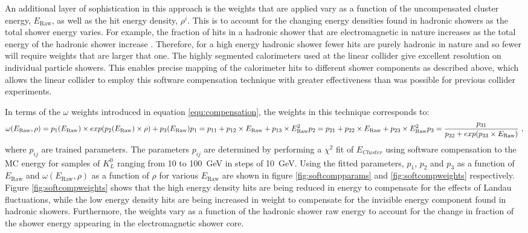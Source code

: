 An additional layer of sophistication in this approach is the weights that are applied vary as a function of the uncompensated cluster energy, $E_{\text{Raw}}$, as well as the hit energy density, $\rho^{i}$.  This is to account for the changing energy densities found in hadronic showers as the total shower energy varies.  For example, the fraction of hits in a hadronic shower that are electromagnetic in nature increases as the total energy of the hadronic shower increase \cite{Wigmans:2000vf}.  Therefore, for a high energy hadronic shower fewer hits are purely hadronic in nature and so fewer will require weights that are larger that one.  The highly segmented calorimeters used at the linear collider give excellent resolution on individual particle showers.  This enables precise mapping of the calorimeter hits to different shower components as described above, which allows the linear collider to employ this software compensation technique with greater effectiveness than was possible for previous collider experiments.  

In terms of the $\omega$ weights introduced in equation \ref{equ:compensation}, the weights \cite{Adloff:2012gv} in this technique corresponds to: 
%
\begin{equation}
\omega(E_{\text{Raw}}, \rho) = p_{1}(E_{\text{Raw}}) \times exp(p_{2}(E_{\text{Raw}}) \times \rho) + p_{3}(E_{\text{Raw}}) \\
p_{1} = p_{11} + p_{12} \times E_{\text{Raw}} + p_{13} \times E_{\text{Raw}}^{2} \\
p_{2} = p_{21} + p_{22} \times E_{\text{Raw}} + p_{23} \times E_{\text{Raw}}^{2} \\
p_{3} = \frac{p_{31}}{p_{32} + exp(p_{33} \times E_{\text{Raw}})}\text{ ,}
\label{equ:softcompweight}
\end{equation}
%
\noindent where $p_{ij}$ are trained parameters.  The parameters $p_{ij}$ are determined by performing a $\chi^{2}$ fit of $E_{Cluster}$ using software compensation to the MC energy for samples of $K^{0}_{L}$ ranging from 10 to 100~GeV in steps of 10~GeV.  Using the fitted parameters, $p_{1}$, $p_{2}$ and $p_{3}$ as a function of $E_{\text{Raw}}$ and $\omega(E_{\text{Raw}}, \rho)$ as a function of $\rho$ for various $E_{\text{Raw}}$ are shown in figure \ref{fig:softcompparams} and \ref{fig:softcompweights} respectively.  Figure \ref{fig:softcompweights} shows that the high energy density hits are being reduced in energy to compensate for the effects of Landau fluctuations, while the low energy density hits are being increased in weight to compensate for the invisible energy component found in hadronic showers.  Furthermore, the weights vary as a function of the hadronic shower raw energy to account for the change in fraction of the shower energy appearing in the electromagnetic shower core.  


